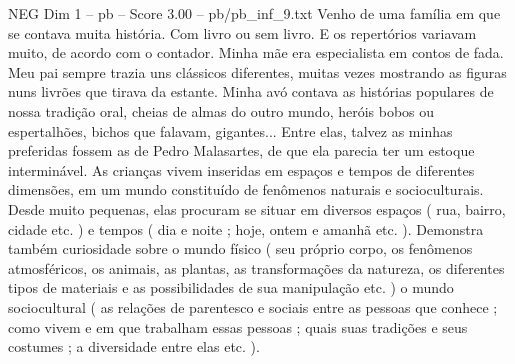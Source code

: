 \begin{textsample}{NEG Dim 1 – pb – Score 3.00 – pb/pb\_inf\_9.txt}
Venho de uma família em que se contava muita história.
Com livro ou sem livro.
E os repertórios variavam muito, de acordo com o contador.
Minha mãe era especialista em contos de fada.
Meu pai sempre trazia uns clássicos diferentes, muitas vezes mostrando as figuras nuns livrões que tirava da estante.
Minha avó contava as histórias populares de nossa tradição oral, cheias de almas do outro mundo, heróis bobos ou espertalhões, bichos que falavam, gigantes...
Entre elas, talvez as minhas preferidas fossem as de Pedro Malasartes, de que ela parecia ter um estoque interminável.
As crianças vivem inseridas em espaços e tempos de diferentes dimensões, em um mundo constituído de fenômenos naturais e socioculturais.
Desde muito pequenas, elas procuram se situar em diversos espaços ( rua, bairro, cidade etc. ) e tempos ( dia e noite ; hoje, ontem e amanhã etc. ).
Demonstra também curiosidade sobre o mundo físico ( seu próprio corpo, os fenômenos atmosféricos, os animais, as plantas, as transformações da natureza, os diferentes tipos de materiais e as possibilidades de sua manipulação etc. ) o mundo sociocultural ( as relações de parentesco e sociais entre as pessoas que conhece ; como vivem e em que trabalham essas pessoas ; quais suas tradições e seus costumes ; a diversidade entre elas etc. ).

\end{textsample}
